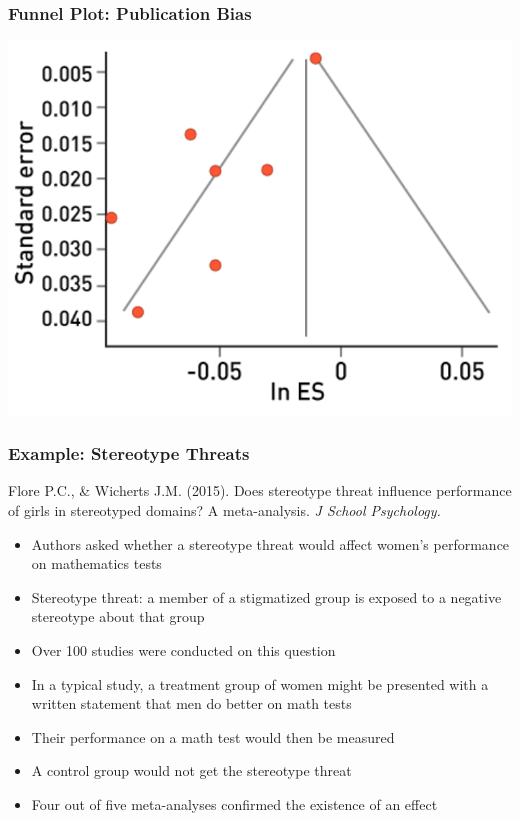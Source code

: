 \documentclass[10pt, block=fill]{beamer}
\begin{document}
\begin{frame}
    \frametitle{Funnel Plot: Publication Bias}
    
    \begin{center}
        \includegraphics[width=0.75\linewidth]{figures/funnel_plot_b.png}
    \end{center}
    
\end{frame}


\begin{frame}
    \frametitle{Example: Stereotype Threats}
    
    Flore P.C., \& Wicherts J.M. (2015). Does stereotype threat influence performance of girls in stereotyped domains? A meta-analysis. \textit{J School Psychology.}
    
    \begin{itemize}
        \item Authors asked whether a stereotype threat would affect women's performance on mathematics tests
        \item Stereotype threat: a member of a stigmatized group is exposed to a negative stereotype about that group
        \item Over 100 studies were conducted on this question
        \item In a typical study, a treatment group of women might be presented with a written statement that men do better on math tests
        \item Their performance on a math test would then be measured
        \item A control group would not get the stereotype threat
        \item Four out of five meta-analyses confirmed the existence of an effect
    \end{itemize}
\end{frame}
\end{document}
